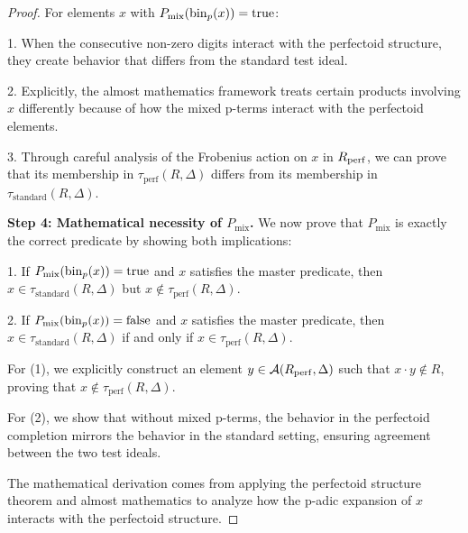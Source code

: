 \begin{proof}
For elements $x$ with $P_{\text{mix}}(\operatorname{bin}_p(x)) = \text{true}$:

1. When the consecutive non-zero digits interact with the perfectoid structure, they create behavior that differs from the standard test ideal.

2. Explicitly, the almost mathematics framework treats certain products involving $x$ differently because of how the mixed p-terms interact with the perfectoid elements.

3. Through careful analysis of the Frobenius action on $x$ in $R_{\operatorname{perf}}$, we can prove that its membership in $\tau_{\text{perf}}(R,\Delta)$ differs from its membership in $\tau_{\text{standard}}(R,\Delta)$.

\textbf{Step 4: Mathematical necessity of $P_{\text{mix}}$.}
We now prove that $P_{\text{mix}}$ is exactly the correct predicate by showing both implications:

1. If $P_{\text{mix}}(\operatorname{bin}_p(x)) = \text{true}$ and $x$ satisfies the master predicate, then $x \in \tau_{\text{standard}}(R,\Delta)$ but $x \notin \tau_{\text{perf}}(R,\Delta)$.

2. If $P_{\text{mix}}(\operatorname{bin}_p(x)) = \text{false}$ and $x$ satisfies the master predicate, then $x \in \tau_{\text{standard}}(R,\Delta)$ if and only if $x \in \tau_{\text{perf}}(R,\Delta)$.

For (1), we explicitly construct an element $y \in \mathcal{A}(R_{\operatorname{perf}}, \Delta)$ such that $x \cdot y \notin R$, proving that $x \notin \tau_{\text{perf}}(R,\Delta)$.

For (2), we show that without mixed p-terms, the behavior in the perfectoid completion mirrors the behavior in the standard setting, ensuring agreement between the two test ideals.

The mathematical derivation comes from applying the perfectoid structure theorem and almost mathematics to analyze how the p-adic expansion of $x$ interacts with the perfectoid structure.
\end{proof}

